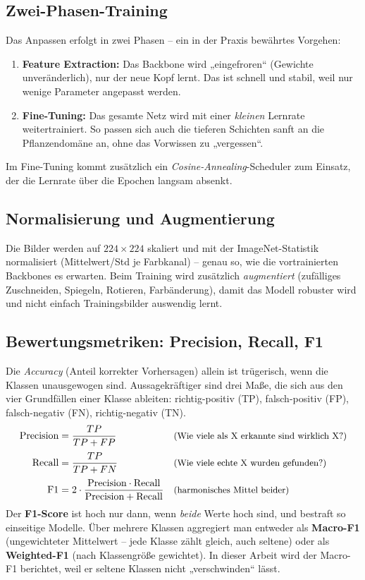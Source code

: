 \documentclass[11pt,a4paper]{article}
\begin{document}
\subsection{Zwei-Phasen-Training}
\label{sec:zweiphasen}
Das Anpassen erfolgt in zwei Phasen -- ein in der Praxis bewährtes Vorgehen:
\begin{enumerate}[nosep]
  \item \textbf{Feature Extraction:} Das Backbone wird „eingefroren“
        (Gewichte unveränderlich), nur der neue Kopf lernt. Das ist schnell und
        stabil, weil nur wenige Parameter angepasst werden.
  \item \textbf{Fine-Tuning:} Das gesamte Netz wird mit einer \emph{kleinen}
        Lernrate weitertrainiert. So passen sich auch die tieferen Schichten
        sanft an die Pflanzendomäne an, ohne das Vorwissen zu „vergessen“.
\end{enumerate}
Im Fine-Tuning kommt zusätzlich ein \emph{Cosine-Annealing}-Scheduler zum
Einsatz, der die Lernrate über die Epochen langsam absenkt.

\subsection{Normalisierung und Augmentierung}
Die Bilder werden auf $224\times224$ skaliert und mit der ImageNet-Statistik
normalisiert (Mittelwert/Std je Farbkanal) -- genau so, wie die vortrainierten
Backbones es erwarten. Beim Training wird zusätzlich \emph{augmentiert}
(zufälliges Zuschneiden, Spiegeln, Rotieren, Farbänderung), damit das Modell
robuster wird und nicht einfach Trainingsbilder auswendig lernt.

\subsection{Bewertungsmetriken: Precision, Recall, F1}
\label{sec:metriken}
Die \emph{Accuracy} (Anteil korrekter Vorhersagen) allein ist trügerisch, wenn
die Klassen unausgewogen sind. Aussagekräftiger sind drei Maße, die sich aus den
vier Grundfällen einer Klasse ableiten: richtig-positiv (TP), falsch-positiv
(FP), falsch-negativ (FN), richtig-negativ (TN).
\begin{align*}
\text{Precision} &= \frac{TP}{TP + FP}
   && \text{\small(Wie viele als X erkannte sind wirklich X?)}\\[2pt]
\text{Recall} &= \frac{TP}{TP + FN}
   && \text{\small(Wie viele echte X wurden gefunden?)}\\[2pt]
\text{F1} &= 2\cdot\frac{\text{Precision}\cdot\text{Recall}}{\text{Precision}+\text{Recall}}
   && \text{\small(harmonisches Mittel beider)}
\end{align*}
Der \textbf{F1-Score} ist hoch nur dann, wenn \emph{beide} Werte hoch sind, und
bestraft so einseitige Modelle. Über mehrere Klassen aggregiert man entweder als
\textbf{Macro-F1} (ungewichteter Mittelwert -- jede Klasse zählt gleich, auch
seltene) oder als \textbf{Weighted-F1} (nach Klassengröße gewichtet). In dieser
Arbeit wird der Macro-F1 berichtet, weil er seltene Klassen nicht „verschwinden“
lässt.
\end{document}
